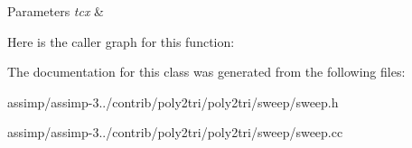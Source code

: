 \begin{DoxyParams}{Parameters}
{\em tcx} & \\
\hline
\end{DoxyParams}


Here is the caller graph for this function\+:




The documentation for this class was generated from the following files\+:\begin{DoxyCompactItemize}
\item 
assimp/assimp-\/3../contrib/poly2tri/poly2tri/sweep/sweep.\+h\item 
assimp/assimp-\/3../contrib/poly2tri/poly2tri/sweep/sweep.\+cc\end{DoxyCompactItemize}
